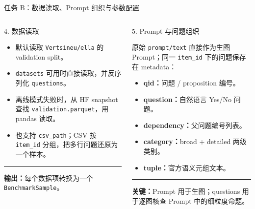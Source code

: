 \documentclass[aspectratio=169,10pt]{beamer}
\begin{document}
\begin{frame}{任务 B：数据读取、Prompt 组织与参数配置}
  \begin{columns}[T,onlytextwidth]
      \begin{block}{4. 数据读取}
        \begin{minipage}[c][5.05cm][c]{\linewidth}
          \begin{itemize}\scriptsize
            \item 默认读取 \texttt{Vertsineu/ella} 的 validation split。
            \item \texttt{datasets} 可用时直接读取，并反序列化 \texttt{questions}。
            \item 离线模式失败时，从 HF snapshot 查找 \texttt{validation.parquet}，用 pandas 读取。
            \item 也支持 \texttt{csv\_path}；CSV 按 \texttt{item\_id} 分组，把多行问题还原为一个样本。
          \end{itemize}
          \vspace{0.45em}
          \color{T2IGray}\rule{\linewidth}{0.35pt}\par\vspace{0.3em}
          \scriptsize\textbf{输出：}每个数据项转换为一个 \texttt{BenchmarkSample}。
        \end{minipage}
      \end{block}

      \begin{block}{5. Prompt 与问题组织}
        \begin{minipage}[c][5.05cm][c]{\linewidth}
          \scriptsize
          原始 \texttt{prompt/text} 直接作为生图 Prompt；同一 \texttt{item\_id} 下的问题保存在 metadata：
          \begin{itemize}\scriptsize
            \item \textbf{qid：}问题 / proposition 编号。
            \item \textbf{question：}自然语言 Yes/No 问题。
            \item \textbf{dependency：}父问题编号列表。
            \item \textbf{category：}broad + detailed 两级类别。
            \item \textbf{tuple：}官方语义元组文本。
          \end{itemize}
          \vspace{0.45em}
          \color{T2IGray}\rule{\linewidth}{0.35pt}\par\vspace{0.3em}
          \scriptsize\textbf{关键：}Prompt 用于生图；questions 用于逐图核查 Prompt 中的细粒度命题。
        \end{minipage}
      \end{block}


\end{columns}
\end{frame}
\end{document}
